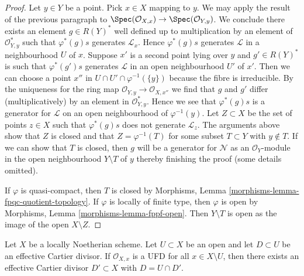 \begin{proof}
\medskip\noindent
Let $y \in Y$ be a point.
Pick $x \in X$ mapping to $y$. We may apply the result of the previous
paragraph to $\Spec(\mathcal{O}_{X, x}) \to \Spec(\mathcal{O}_{Y, y})$.
We conclude there exists an element $g \in R(Y)^*$ well defined up to
multiplication by an element of $\mathcal{O}_{Y, y}^*$ such that
$\varphi^*(g)s$ generates $\mathcal{L}_x$. Hence $\varphi^*(g)s$
generates $\mathcal{L}$ in a neighbourhood $U$ of $x$.
Suppose $x'$ is a second point lying over $y$ and $g' \in R(Y)^*$ is
such that $\varphi^*(g')s$ generates $\mathcal{L}$ in an open neighbourhood
$U'$ of $x'$. Then we can choose a point
$x''$ in $U \cap U' \cap \varphi^{-1}(\{y\})$
because the fibre is irreducible. By the uniqueness for
the ring map $\mathcal{O}_{Y, y} \to \mathcal{O}_{X, x''}$
we find that $g$ and $g'$ differ (multiplicatively)
by an element in $\mathcal{O}_{Y, y}^*$. Hence we see that $\varphi^*(g)s$
is a generator for $\mathcal{L}$ on an open neighbourhood
of $\varphi^{-1}(y)$. Let $Z \subset X$ be the set of points
$z \in X$ such that $\varphi^*(g)s$ does not generate $\mathcal{L}_z$.
The arguments above show that $Z$ is closed and that $Z = \varphi^{-1}(T)$
for some subset $T \subset Y$ with $y \not \in T$. If we can show that
$T$ is closed, then $g$ will be a generator for $\mathcal{N}$ as an
$\mathcal{O}_Y$-module in the open neighbourhood $Y \setminus T$ of $y$
thereby finishing the proof (some details omitted).

\medskip\noindent
If $\varphi$ is quasi-compact, then $T$ is closed by
Morphisms, Lemma \ref{morphisms-lemma-fpqc-quotient-topology}.
If $\varphi$ is locally of finite type, then $\varphi$ is open
by Morphisms, Lemma \ref{morphisms-lemma-fppf-open}.
Then $Y \setminus T$ is open as the image of the open $X \setminus Z$.
\end{proof}

\begin{lemma}
\label{lemma-closure-effective-cartier-divisor}
Let $X$ be a locally Noetherian scheme. Let $U \subset X$ be
an open and let $D \subset U$ be an effective Cartier divisor.
If $\mathcal{O}_{X, x}$ is a UFD for all $x \in X \setminus U$,
then there exists an effective Cartier divisor $D' \subset X$
with $D = U \cap D'$.
\end{lemma}

